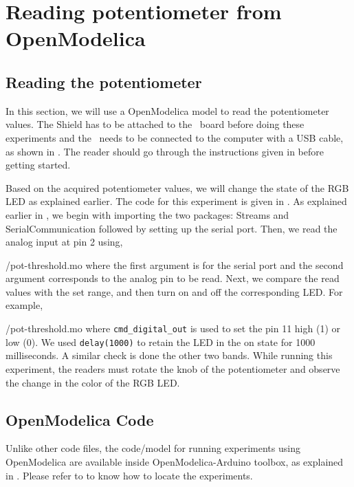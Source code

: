 \section{Reading potentiometer from OpenModelica}
\subsection{Reading the potentiometer}
In this section, we will use a OpenModelica model to read the potentiometer values.  
The Shield has to be attached to the \arduino\ board
before doing these experiments and the \arduino\ needs to be connected to the computer 
with a USB cable, as shown in .
The reader should go through the instructions given in
 before getting started.

Based on the acquired potentiometer values, we will change the state of the 
RGB LED as explained earlier. The code for this experiment is given in
. As explained earlier in , 
  we begin with importing the two packages: Streams and SerialCommunication followed 
  by setting up the serial port. Then, we read the analog input at pin 2 using,

{\LocPotOpenModelicacode/pot-threshold.mo} where the first argument is for
the serial port and the second argument corresponds to the analog pin to be read.  Next, we compare the read values with the set range, and then turn on and off the corresponding LED. For example, 

{\LocPotOpenModelicacode/pot-threshold.mo} 
where {\tt cmd\_digital\_out} is used to set the pin 11 high (1) or low (0). 
We used {\tt delay(1000)} to retain the LED in the on state for 1000 milliseconds.  
A similar check is done the other two bands. 
While running this experiment, 
the readers must rotate the knob of the potentiometer and observe 
the change in the color of the RGB LED.
\subsection{OpenModelica Code}
Unlike other code files, the code/model for running experiments using OpenModelica are 
available inside OpenModelica-Arduino toolbox, as explained in .
Please refer to  to know how to locate the experiments. 

\label{sec:pot-OpenModelica-code}
\begin{OpenModelicacode}
\label{OpenModelica:pot-100}

\end{OpenModelicacode}
